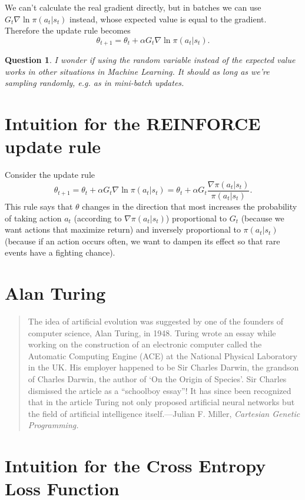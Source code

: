 \documentclass[20pt]{extarticle}
\theoremstyle{plain}
\newtheorem{question}[theorem]{Question}
\theoremstyle{definition}
\theoremstyle{remark}
\newcommand{\0}{\varnothing}
\newcommand{\<}{\langle}
\renewcommand{\>}{\rangle}
\begin{document}
We can't calculate the real gradient directly, but in batches we can use $ G_t \nabla \ln \pi(a_t|s_t) $ instead, whose expected value is equal to the gradient. Therefore the update rule becomes $$
\theta_{t+1} = \theta_t + \alpha G_t \nabla \ln \pi(a_t|s_t).
$$

\begin{question}
  I wonder if using the random variable instead of the expected value works in other situations in Machine Learning. It should as long as we're sampling randomly, e.g. as in mini-batch updates.
\end{question}

\section{Intuition for the REINFORCE update rule}

Consider the update rule \[
\theta_{t+1} = \theta_t + \alpha G_t \nabla \ln \pi(a_t|s_t) = \theta_t + \alpha G_t  \frac{\nabla \pi(a_t|s_t)}{\pi(a_t|s_t)}.
\]
This rule says that $ \theta $ changes in the direction that most increases the probability of taking action $ a_t $ (according to $ \nabla \pi(a_t|s_t) $) proportional to $ G_t $ (because we want actions that maximize return) and inversely proportional to $ \pi(a_t|s_t)$ (because if an action occurs often, we want to dampen its effect so that rare events have a fighting chance).

\section{Alan Turing}

\begin{quote}
  The idea of artificial evolution was suggested by one of the founders of computer science, Alan Turing, in 1948. Turing wrote an essay while working on the construction of an electronic computer called the Automatic Computing Engine (ACE) at the National Physical Laboratory in the UK. His employer happened to be Sir Charles Darwin, the grandson of Charles Darwin, the author of `On the Origin of Species'. Sir Charles dismissed the article as a ``schoolboy essay''! It has since been recognized that in the article Turing not only proposed artificial neural networks but the field of artificial intelligence itself.---Julian F. Miller, \emph{Cartesian Genetic Programming.}
\end{quote}

\section{Intuition for the Cross Entropy Loss Function}
\end{document}
